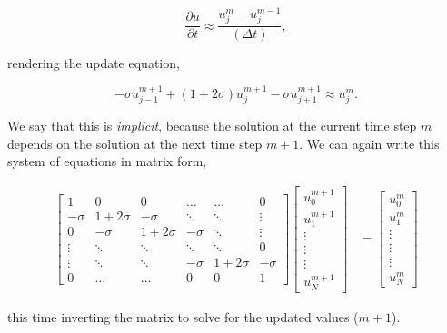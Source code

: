 \documentclass[12pt]{article}
\begin{document}
\vspace{2mm}

$$ \frac{\partial u}{\partial t} \approx \frac{u_j^{m} - u_j^{m-1}}{(\Delta t)}, $$

\vspace{4mm}
	
rendering the update equation,

$$ -\sigma u_{j-1}^{m+1} + (1+2\sigma)u_{j}^{m+1} - \sigma u_{j+1}^{m+1} \approx u_{j}^{m}. $$
	
\vspace{4mm}	
	
We say that this is {\it implicit}, because the solution at the current time step $m$ depends on the solution at the next time step $m+1$. We can again write this system of equations in matrix form,

\begin{align*}
\begin{bmatrix}
  	1 & 0 & 0 & \dots & \dots & 0 \\[1ex]
    -\sigma & 1+2\sigma & -\sigma & \ddots & \ddots & \vdots  \\[1ex]
    0 & -\sigma & 1+2\sigma & -\sigma & \ddots & \vdots \\[1ex]
    \vdots & \ddots & \ddots & \ddots & \ddots & 0 \\[1ex]
    \vdots & \ddots & \ddots & -\sigma & 1+2\sigma & -\sigma \\[1ex]
    0 & \dots & \dots & 0 & 0 & 1
\end{bmatrix}
\begin{bmatrix}
	u_0^{m+1} \\[1.1ex]
	u_1^{m+1} \\[1.1ex]
	\vdots \\[1.1ex]
	\vdots \\[1.1ex]
	\vdots \\[1.1ex]
	u_N^{m+1}
\end{bmatrix}
&=
\begin{bmatrix}
	u_0^{m} \\[1.2ex]
	u_1^{m} \\[1.2ex]
	\vdots \\[1.2ex]
	\vdots \\[1.2ex]
	\vdots \\[1.2ex]
	u_N^{m}
\end{bmatrix} 
\end{align*}

\vspace{4mm}	

this time inverting the matrix to solve for the updated values ($m+1$).
\end{document}

